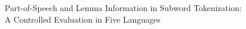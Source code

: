 Part-of-Speech and Lemma Information in Subword Tokenization:\\A Controlled Evaluation in Five Languages